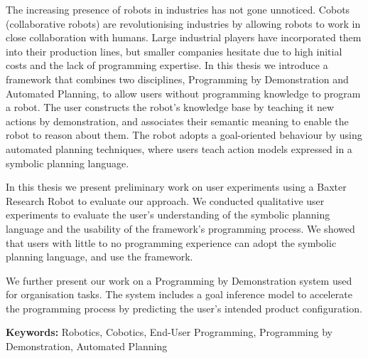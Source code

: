 The increasing presence of robots in industries has not gone unnoticed. 
Cobots (collaborative robots) are revolutionising industries by allowing robots to work in close collaboration with humans.
Large industrial players have incorporated them into their production lines, but smaller companies hesitate due to high initial costs and the lack of programming expertise. 
In this thesis we introduce a framework that combines two disciplines, Programming by Demonstration and Automated Planning, to allow users without programming knowledge to program a robot. 
The user constructs the robot's knowledge base by teaching it new actions by demonstration, and associates their semantic meaning to enable the robot to reason about them. 
The robot adopts a goal-oriented behaviour by using automated planning techniques, where users teach action models expressed in a symbolic planning language.

In this thesis we present preliminary work on user experiments using a Baxter Research Robot to evaluate our approach.
We conducted qualitative user experiments to evaluate the user's understanding of the symbolic planning language and the usability of the framework's programming process.
We showed that users with little to no programming experience can adopt the symbolic planning language, and use the framework.

We further present our work on a Programming by Demonstration system used for organisation tasks.
The system includes a goal inference model to accelerate the programming process by predicting the user's intended product configuration.

\textbf{Keywords:} Robotics, Cobotics, End-User Programming, Programming by Demonstration, Automated Planning